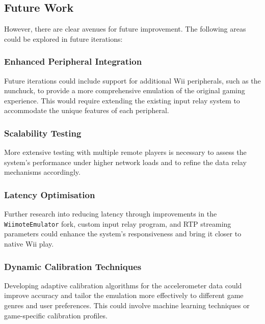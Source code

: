 \subsection*{Future Work}
However, there are clear avenues for future improvement. The following areas could be explored in future iterations:

\subsubsection{Enhanced Peripheral Integration}
Future iterations could include support for additional Wii peripherals, such as the nunchuck, to provide a more comprehensive emulation of the original gaming experience. This would require extending the existing input relay system to accommodate the unique features of each peripheral.

\subsubsection{Scalability Testing}
More extensive testing with multiple remote players is necessary to assess the system’s performance under higher network loads and to refine the data relay mechanisms accordingly.

\subsubsection{Latency Optimisation}
Further research into reducing latency through improvements in the \texttt{WiimoteEmulator} fork, custom input relay program, and RTP streaming parameters could enhance the system’s responsiveness and bring it closer to native Wii play.

\subsubsection{Dynamic Calibration Techniques}
Developing adaptive calibration algorithms for the accelerometer data could improve accuracy and tailor the emulation more effectively to different game genres and user preferences. This could involve machine learning techniques or game-specific calibration profiles.
